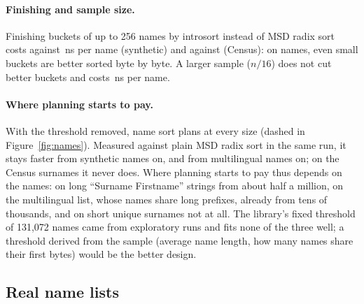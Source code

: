 \documentclass[11pt]{article}
\theoremstyle{definition}
\begin{document}
\paragraph{Finishing and sample size.} Finishing buckets of up to 256
names by introsort instead of MSD radix sort costs
 against \,ns
per name (synthetic) and  against
 (Census): on names, even small buckets
are better sorted byte by byte. A larger sample ($n/16$) does not cut better
buckets and costs \,ns per name.

\paragraph{Where planning starts to pay.} With the threshold removed,
name sort plans at every size (dashed in Figure~\ref{fig:names}). Measured
against plain MSD radix sort in the same run, it stays faster from
 synthetic names on, and from 
multilingual names on; on the  Census surnames it never
does. Where planning starts to pay thus
depends on the names: on long ``Surname Firstname'' strings from about half a
million, on the multilingual list, whose names share long prefixes, already
from tens of thousands, and on short unique surnames not at all. The library's
fixed threshold of 131{,}072 names came from exploratory runs and fits none of
the three well; a threshold derived from the sample (average name length, how
many names share their first bytes) would be the better design.

\subsection{Real name lists}\label{sec:real}

\begin{table}[t]
\centering
\small
\resizebox{\linewidth}{!}{}
\caption{Real name lists at full size, ns per name, median of 7; the faster of
MSD radix sort and name sort in bold.}
\label{tab:real}
\end{table}
\end{document}

